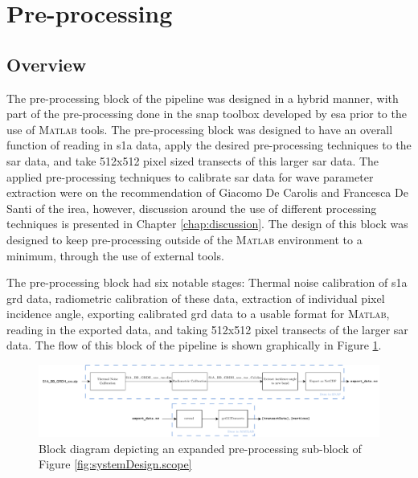 \section{Pre-processing} \label{sec:systemDesign.preProcessing}


\subsection{Overview} \label{subsec:systemDesign.preProcessing.Overview}

The pre-processing block of the pipeline was designed in a hybrid manner, with part of the pre-processing done in the \ac{snap} toolbox developed by \ac{esa} prior to the use of \textsc{Matlab} tools. The pre-processing block was designed to have an overall function of reading in \ac{s1a} data, apply the desired pre-processing techniques to the \acs{sar} data, and take 512x512 pixel sized transects of this larger \acs{sar} data. The applied pre-processing techniques to calibrate \acs{sar} data for wave parameter extraction were on the recommendation of Giacomo De Carolis and Francesca De Santi of the \acs{irea}, however, discussion around the use of different processing techniques is presented in Chapter \ref{chap:discussion}. The design of this block was designed to keep pre-processing outside of the \textsc{Matlab} environment to a minimum, through the use of external tools. 

The pre-processing block had six notable stages: Thermal noise calibration of \acs{s1a} \acs{grd} data, radiometric calibration of these data, extraction of individual pixel incidence angle, exporting calibrated \acs{grd} data to a usable format for \textsc{Matlab}, reading in the exported data, and taking 512x512 pixel transects of the larger \acs{sar} data. The flow of this block of the pipeline is shown graphically in Figure \ref{fig:systemDesign.preProcessing.blockDiagram}.

\begin{figure}[H]
    \centering
    \includegraphics[width=.95\linewidth]{Figures/PipelineDesign/pre_processing.pdf}
    \caption{Block diagram depicting an expanded pre-processing sub-block of Figure \ref{fig:systemDesign.scope}}
    \label{fig:systemDesign.preProcessing.blockDiagram}
\end{figure}

